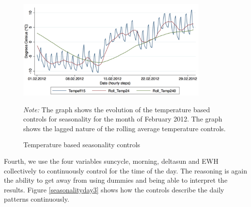 \begin{figure}[!ht]
\begin{center}
\includegraphics[height=50mm]{figch2/tempseasonality2.pdf} 
\caption{Temperature based seasonality controls}
\label{tempseasonality2}
\end{center}
\emph{Note: } The graph shows the evolution of the temperature based controls for seasonality for the month of February 2012. The graph shows the lagged nature of the rolling average temperature controls. 
\end{figure}
Fourth, we use the four variables suncycle, morning, deltasun and EWH collectively to continuously control for the time of the day. The reasoning is again the ability to get away from using dummies and being able to interpret the results. Figure \ref{seasonalityday3} shows how the controls describe the daily patterns continuously. \\


